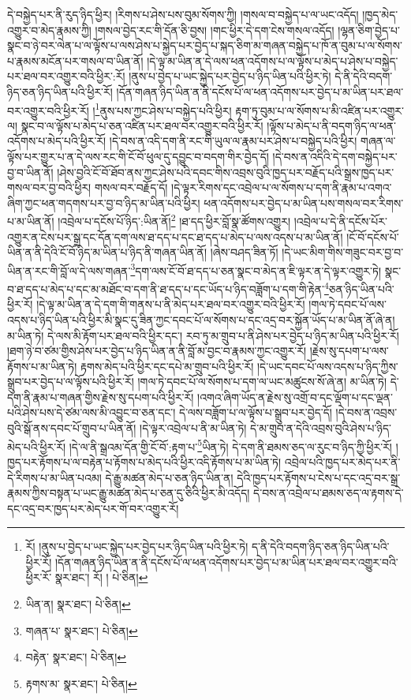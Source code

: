 དེ་བསྐྱེད་པར་ནི་རུད་ཉིད་ཕྱིར། །རིགས་པ་ཤེས་པས་བུམ་སོགས་ཀྱི། །གསལ་བ་བསྐྱེད་པ་ལ་ཡང་འདོད། །ཁྱད་མེད་འགྱུར་བ་མེད་རྣམས་ཀྱི། །གསལ་བྱེད་རང་གི་དོན་ཅི་བྱས། །གང་ཕྱིར་དེ་དག་ངེས་གསལ་འདོད། །ལྷན་ཅིག་བྱེད་པ་སྣང་བ་ཉེ་བར་ལེན་པ་ལ་ལྟོས་པ་ལས་ཤེས་པ་སྐྱེད་པར་བྱེད་པ་སྐད་ཅིག་མ་གཞན་བསྐྱེད་པ་ཁོ་ན་བུམ་པ་ལ་སོགས་པ་རྣམས་མངོན་པར་གསལ་བ་ཡིན་ནོ། །དེ་ལྟ་མ་ཡིན་ན་དེ་ལས་ཕན་འདོགས་པ་ལ་ལྟོས་པ་མེད་པ་ཤེས་པ་བསྐྱེད་པར་ཐལ་བར་འགྱུར་བའི་ཕྱིར་:རོ། །ནུས་པ་བྱེད་པ་ཡང་སྐྱེད་པར་བྱེད་པ་ཉིད་ཡིན་པའི་ཕྱིར་ཏེ། དེ་ནི་དེའི་བདག་ཉིད་ཅན་ཉིད་ཡིན་པའི་ཕྱིར་རོ། །དོན་གཞན་ཉིད་ཡིན་ན་ནི་དངོས་པོ་ལ་ཕན་འདོགས་པར་བྱེད་པ་མ་ཡིན་པར་ཐལ་བར་འགྱུར་བའི་ཕྱིར་རོ། །\footnote{རོ། །ནུས་པ་བྱེད་པ་ཡང་སྐྱེད་པར་བྱེད་པར་ཉིད་ཡིན་པའི་ཕྱིར་ཏེ། ད་ནི་དེའི་བདག་ཉིད་ཅན་ཉིད་ཡིན་པའི་ཕྱིར་རོ། །དོན་གཞན་ཉིད་ཡིན་ན་ནི་དངོས་པོ་ལ་ཕན་འདོགས་པར་བྱེད་པ་མ་ཡིན་པར་ཐལ་བར་འགྱུར་བའི་ཕྱིར་རོ་  སྣར་ཐང་། རོ། །  པེ་ཅིན། }ནུས་པས་ཀྱང་ཤེས་པ་བསྐྱེད་པའི་ཕྱིར། རྟག་ཏུ་བུམ་པ་ལ་སོགས་པ་མི་འཛིན་པར་འགྱུར་ལ། སྣང་བ་ལ་ལྟོས་པ་མེད་པ་ཅན་འཛིན་པར་ཐལ་བར་འགྱུར་བའི་ཕྱིར་རོ། །ལྟོས་པ་མེད་པ་ནི་བདག་ཉིད་ལ་ཕན་འདོགས་པ་མེད་པའི་ཕྱིར་རོ། །དེ་བས་ན་འདི་དག་ནི་རང་གི་ཡུལ་ལ་རྣམ་པར་ཤེས་པ་བསྐྱེད་པའི་ཕྱིར། གཞན་ལ་ལྟོས་པར་གྱུར་པ་ན་དེ་ལས་རང་གི་ངོ་བོ་ཕུལ་དུ་དབྱུང་བ་བདག་གིར་བྱེད་དོ། །དེ་བས་ན་འདིའི་དེ་དག་བསྐྱེད་པར་བྱ་བ་ཡིན་ནོ། །ཤེས་བྱའི་ངོ་བོ་ཐོབ་ནས་ཀྱང་ཤེས་པའི་དབང་གིས་འབྲས་བུའི་ཁྱད་པར་བརྗོད་པའི་སྒྲས་ཁྱད་པར་གསལ་བར་བྱ་བའི་ཕྱིར། གསལ་བར་བརྗོད་དོ། །དེ་ལྟར་རིགས་དང་འབྲེལ་པ་ལ་སོགས་པ་དག་ནི་རྣམ་པ་འགའ་ཞིག་ཀྱང་ཕན་གདགས་པར་བྱ་བ་ཉིད་མ་ཡིན་པའི་ཕྱིར། ཕན་འདོགས་པར་བྱེད་པ་མ་ཡིན་པས་གསལ་བར་རིགས་པ་མ་ཡིན་ནོ། །འབྲེལ་པ་དངོས་པོ་ཉིད་:ཡིན་ནོ།\footnote{ཡིན་ན།  སྣར་ཐང་།  པེ་ཅིན། } །ཐ་དད་ཕྱིར་བློ་སྣ་ཚོགས་འགྱུར། །འབྲེལ་པ་དེ་ནི་དངོས་པོར་འགྱུར་ན་ངེས་པར་སྒྲ་དང་དོན་དག་ལས་ཐ་དད་པ་དང་ཐ་དད་པ་མེད་པ་ལས་འདས་པ་མ་ཡིན་ནོ། །ངོ་བོ་དངོས་པོ་ཡིན་ན་ནི་དེའི་ངོ་བོ་ཉིད་མ་ཡིན་པ་ཉིད་ནི་གཞན་ཡིན་ནོ། །ཞེས་བཤད་ཟིན་ཏོ། །དེ་ཡང་མིག་གིས་གཟུང་བར་བྱ་བ་ཡིན་ན་རང་གི་བློ་ལ་དེ་ལས་གཞན་\footnote{གཞན་པ་  སྣར་ཐང་།  པེ་ཅིན། }དག་ལས་ངོ་བོ་ཐ་དད་པ་ཅན་སྣང་བ་མེད་ན་ཇི་ལྟར་ན་དེ་ལྟར་འགྱུར་ཏེ། སྣང་བ་ཐ་དད་པ་མེད་པ་དང་མ་མཐོང་བ་དག་ནི་ཐ་དད་པ་དང་ཡོད་པ་ཉིད་བཟློག་པ་དག་གི་རྟེན་\footnote{བརྟེན་  སྣར་ཐང་།  པེ་ཅིན། }ཅན་ཉིད་ཡིན་པའི་ཕྱིར་རོ། །དེ་ལྟ་མ་ཡིན་ན་དེ་དག་གི་གནས་པ་ནི་མེད་པར་ཐལ་བར་འགྱུར་བའི་ཕྱིར་རོ། །གལ་ཏེ་དབང་པོ་ལས་འདས་པ་ཉིད་ཡིན་པའི་ཕྱིར་མི་སྣང་དུ་ཟིན་ཀྱང་དབང་པོ་ལ་སོགས་པ་དང་འདྲ་བར་སྐྱོན་ཡོད་པ་མ་ཡིན་ནོ་ཞེ་ན། མ་ཡིན་ཏེ། དེ་ལས་མི་རྟོག་པར་ཐལ་བའི་ཕྱིར་དང་། རབ་ཏུ་མ་གྲུབ་པ་ནི་ཤེས་པར་བྱེད་པ་ཉིད་མ་ཡིན་པའི་ཕྱིར་རོ། །ཐག་ཉེ་བ་ཙམ་གྱིས་ཤེས་པར་བྱེད་པ་ཉིད་ཡིན་ན་ནི་བློ་མ་བྱང་བ་རྣམས་ཀྱང་འགྱུར་རོ། །རྗེས་སུ་དཔག་པ་ལས་རྟོགས་པ་མ་ཡིན་ཏེ། རྟགས་མེད་པའི་ཕྱིར་དང་དཔེ་མ་གྲུབ་པའི་ཕྱིར་རོ། །དེ་ཡང་དབང་པོ་ལས་འདས་པ་ཉིད་ཀྱིས་སྒྲུབ་པར་བྱེད་པ་ལ་ལྟོས་པའི་ཕྱིར་རོ། །གལ་ཏེ་དབང་པོ་ལ་སོགས་པ་དག་ལ་ཡང་མཚུངས་སོ་ཞེ་ན། མ་ཡིན་ཏེ། དེ་དག་ནི་རྣམ་པ་གཞན་གྱིས་རྗེས་སུ་དཔག་པའི་ཕྱིར་རོ། །འགའ་ཞིག་ཡོད་ན་རྗེས་སུ་འགྲོ་བ་དང་ལྡོག་པ་དང་ལྡན་པའི་ཤེས་པས་དེ་ཙམ་ལས་མི་འབྱུང་བ་ཅན་དང་། དེ་ལས་བཟློག་པ་ལ་ལྟོས་པ་སྒྲུབ་པར་བྱེད་དོ། །དེ་བས་ན་འབྲས་བུའི་སྒོ་ནས་དབང་པོ་གྲུབ་པ་ཡིན་ནོ། །དེ་ལྟར་འབྲེལ་པ་ནི་མ་ཡིན་ཏེ། དེ་མ་གྲུབ་ན་དེའི་འབྲས་བུའི་ཤེས་པ་ཉིད་མེད་པའི་ཕྱིར་རོ། །དེ་ལ་ནི་སྒྲའམ་དོན་གྱི་ངོ་བོ་:རྟག་པ་\footnote{རྟགས་མ་  སྣར་ཐང་།  པེ་ཅིན། }ཡིན་ཏེ། དེ་དག་ནི་ཐམས་ཅད་ལ་རུང་བ་ཉིད་ཀྱི་ཕྱིར་རོ། །ཁྱད་པར་རྟོགས་པ་ལ་བརྟེན་པ་རྟོགས་པ་མེད་པའི་ཕྱིར་འདི་རྟོགས་པ་མ་ཡིན་ཏེ། འབྲེལ་པའི་ཁྱད་པར་མེད་པར་ནི་དེ་རིགས་པ་མ་ཡིན་པའམ། དེ་རྒྱུ་མཚན་མེད་པ་ཅན་ཉིད་ཡིན་ན། དེའི་ཁྱད་པར་རྟོགས་པ་ངེས་པ་དང་འདྲ་བར་སྒྲ་རྣམས་ཀྱིས་བསྟན་པ་ཡང་རྒྱུ་མཚན་མེད་པ་ཅན་དུ་ཅིའི་ཕྱིར་མི་འདོད། དེ་བས་ན་འབྲེལ་པ་ཐམས་ཅད་ལ་རྟགས་དེ་དང་འདྲ་བར་ཁྱད་པར་མེད་པར་གོ་བར་འགྱུར་རོ། 